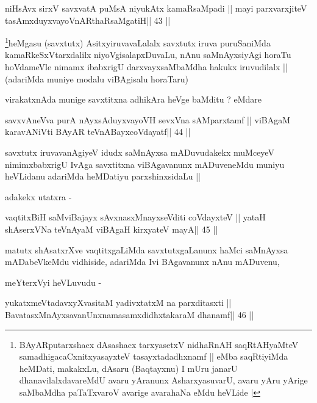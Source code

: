 \begin{shl}
niHsAvx sirxV savxvatA puMsA niyukAtx kamaRsaMpadi ||
mayi parxvarxjiteV tasAmxduyxvayoVnARthaRsaMgatiH\hfill || 43 ||
\end{shl}

\begin{artha}
\footnote[1]{BAyARputarxshacx dAsashacx tarxyasetxV nidhaRnAH
  saqRtAHyaMteV samadhigacaCxnitxyasayxteV tasayxtadadhxnamf || eMba
  saqRtiyiMda heMDati, makakxLu, dAsaru (Baqtayxnu) I mUru janarU
  dhanavilalxdavareMdU avaru yAranunx AsharxyasuvarU, avaru yAru
  yArige saMbaMdha paTaTxvaroV avarige avarahaNa eMdu heVLide |}heMgasu (savxtutx) AsitxyiruvavaLalalx savxtutx iruva
puruSaniMda kamaRkeSxVtarxdalilx niyoVgisalapxDuvaLu, nAnu
saMnAyxsiyAgi horaTu hoVdameVle nimamx ibabxrigU darxvayxsaMbaMdha
hakukx iruvudilalx || (adariMda muniye modalu viBAgisalu horaTaru)

virakatxnAda munige savxtitxna adhikAra heVge baMditu ? eMdare
\end{artha}

\begin{shl}
savxvAneVva purA nAyxsAduyxvayoVH sevxVna sAMparxtamf ||
viBAgaM karavANiVti BAyAR teVnABayxcoVdayatf\hfill || 44 ||
\end{shl}

\begin{artha}
savxtutx iruvavanAgiyeV idudx saMnAyxsa mADuvudakekx muMceyeV
nimimxbabxrigU IvAga savxtitxna viBAgavanunx mADuveneMdu muniyu
heVLidanu adariMda heMDatiyu parxshinxsidaLu || 

adakekx utatxra - 
\end{artha}

\begin{shl}
\footnotemark[1]vaqtitxBiH saMviBajayx sAvxnasxMnayxseVditi coVdayxteV ||
yataH shAserxVNa teVnAyaM viBAgaH kirxyateV mayA\hfill || 45 ||
\end{shl}

\begin{artha}
matutx shAsatxrXve vaqtitxgaLiMda savxtutxgaLanunx haMci saMnAyxsa
mADabeVkeMdu vidhiside, adariMda Ivi BAgavanunx nAnu mADuvenu, 

meYterxVyi heVLuvudu - 
\end{artha}

\begin{shl}
yukatxmeVtadavxyXvasitaM yadivxtatxM na parxditasxti ||
BavatasxMnAyxsavanUnxnamasamxdidhxtakaraM dhanamf\hfill || 46 ||
\end{shl}

